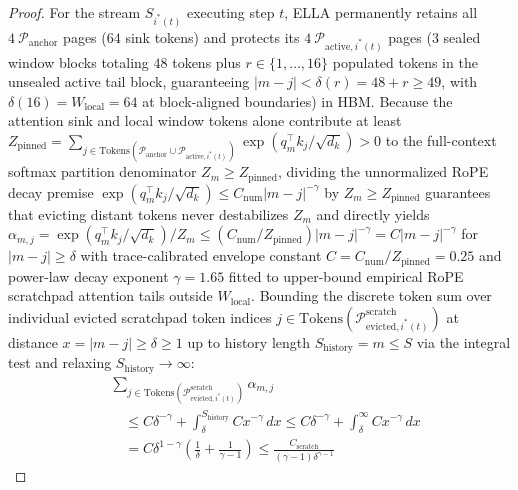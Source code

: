 \documentclass[conference,10pt]{IEEEtran}
\begin{document}
\begin{proof}
For the stream $S_{i^*(t)}$ executing step $t$, ELLA permanently retains all $4\ \mathcal{P}_{\text{anchor}}$ pages ($64$ sink tokens) and protects its $4\ \mathcal{P}_{\text{active}, i^*(t)}$ pages ($3$ sealed window blocks totaling $48$ tokens plus $r \in \{1, \dots, 16\}$ populated tokens in the unsealed active tail block, guaranteeing $|m-j| < \delta(r) = 48 + r \ge 49$, with $\delta(16) = W_{\text{local}} = 64$ at block-aligned boundaries) in HBM. Because the attention sink and local window tokens alone contribute at least $Z_{\text{pinned}} = \sum_{j \in \text{Tokens}(\mathcal{P}_{\text{anchor}} \cup \mathcal{P}_{\text{active}, i^*(t)})} \exp(q_m^\top k_j / \sqrt{d_k}) > 0$ to the full-context softmax partition denominator $Z_m \ge Z_{\text{pinned}}$, dividing the unnormalized RoPE decay premise $\exp(q_m^\top k_j / \sqrt{d_k}) \le C_{\text{num}} |m - j|^{-\gamma}$ by $Z_m \ge Z_{\text{pinned}}$ guarantees that evicting distant tokens never destabilizes $Z_m$ and directly yields $\alpha_{m,j} = \exp(q_m^\top k_j / \sqrt{d_k}) / Z_m \le (C_{\text{num}} / Z_{\text{pinned}})|m-j|^{-\gamma} = C|m-j|^{-\gamma}$ for $|m-j| \ge \delta$ with trace-calibrated envelope constant $C = C_{\text{num}} / Z_{\text{pinned}} = 0.25$ and power-law decay exponent $\gamma = 1.65$ fitted to upper-bound empirical RoPE scratchpad attention tails outside $W_{\text{local}}$. Bounding the discrete token sum over individual evicted scratchpad token indices $j \in \text{Tokens}(\mathcal{P}_{\text{evicted}, i^*(t)}^{\text{scratch}})$ at distance $x = |m - j| \ge \delta \ge 1$ up to history length $S_{\text{history}} = m \le S$ via the integral test and relaxing $S_{\text{history}} \to \infty$:
\begin{equation}
\label{eq:integral_bound}
\begin{aligned}
&\sum_{j \in \text{Tokens}(\mathcal{P}_{\text{evicted}, i^*(t)}^{\text{scratch}})} \alpha_{m, j} \\
&\quad \le C \delta^{-\gamma} + \int_{\delta}^{S_{\text{history}}} C x^{-\gamma}\,dx \le C \delta^{-\gamma} + \int_{\delta}^{\infty} C x^{-\gamma}\,dx \\
&\quad = C\delta^{1-\gamma}\!\left(\frac{1}{\delta} + \frac{1}{\gamma - 1}\right) \le \frac{C_{\text{scratch}}}{(\gamma - 1)\delta^{\gamma - 1}}
\end{aligned}
\end{equation}

\end{proof}
\end{document}
